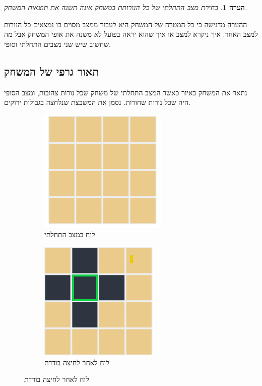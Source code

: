 \documentclass[12pt,leqno]{article}
\theoremstyle{theoremdd}
\newtheorem{comm}{הערה}[section]
\begin{document}
\begin{comm}
    בחירת מצב התחלתי של כל הנורותת במשחק אינה תשנה את תוצאות המשחק.
\end{comm}
ההערה מדגישה כי כל המטרה של המשחק היא לעבור ממצב מסוים בו נמצאים כל הנורות למצב האחר.
איך ניקרא למצב או איך שהוא יראה בפועל לא משנה את אופי המשחק אבל מה שחשוב שיש שני מצבים התחלתי וסופי.

\subsection{תאור גרפי של המשחק}
נתאר את המשחק באיור כאשר
המצב התחלתי של משחק שכל נורות
צהובות, ומצב הסופי היה שכל נורות שחורות.
נסמן את המשבצת שנלחצה בגבולות ירוקים.

\begin{figure}[ht]
    \caption{הסבר שינוי מצב הלוח לאחר לחיצה}
    \centering
    \label{fig: explain game}
    \begin{subfigure}{.3\textwidth}
        \caption{לוח במצב התחלתי}
        \label{subfig: explain game, start}
        \centering
        \includegraphics[scale=0.67]{images/4x4_start_board.PNG}
    \end{subfigure}%
    \begin{subfigure}{.3\textwidth}
        \caption{לוח לאחר לחיצה בודדת}
        \label{subfig: explain game, move}
        \centering
        \includegraphics[scale=0.67]{images/4x4_press.PNG}

\end{subfigure}
\end{figure}
\end{document}
